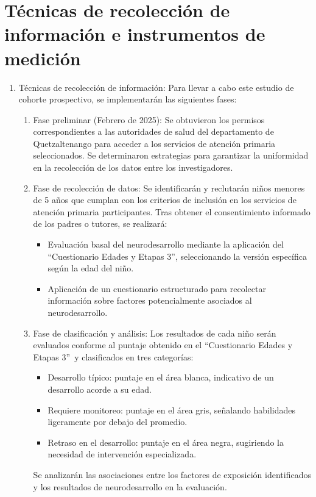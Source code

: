 \documentclass[11pt,letterpaper]{report}
\newcommand{\asq}{“Cuestionario Edades y Etapas 3”}
\begin{document}
\section{Técnicas de recolección de información e instrumentos de medición}
	\begin{enumerate}
		\item Técnicas de recolección de información: Para llevar a cabo este
		estudio de cohorte prospectivo, se implementarán las siguientes fases:
	\begin{enumerate}
		\item Fase preliminar (Febrero de 2025):
		Se obtuvieron los permisos correspondientes a las autoridades de salud
		del departamento de Quetzaltenango para acceder a los servicios de
		atención primaria seleccionados. Se determinaron estrategias para
		garantizar la uniformidad en la recolección de los datos entre los
		investigadores.
		\item Fase de recolección de datos:
		Se identificarán y reclutarán niños menores de 5 años que cumplan con
		los criterios de inclusión en los servicios de atención primaria
		participantes. Tras obtener el consentimiento informado de los padres o
		tutores, se realizará:
			\begin{itemize}
			\item Evaluación basal del neurodesarrollo mediante la aplicación
			del \asq, seleccionando la versión específica según la edad del
			niño.
			\item Aplicación de un cuestionario estructurado para recolectar
			información sobre factores potencialmente asociados al
			neurodesarrollo.
			\end{itemize}
		\item Fase de clasificación y análisis:
		Los resultados de cada niño serán evaluados conforme al
		puntaje obtenido en el \asq\
		y clasificados en tres categorías:
			\begin{itemize}
			\item Desarrollo típico: puntaje en el área blanca, indicativo de
			un desarrollo acorde a su edad.
			\item Requiere monitoreo: puntaje en el área gris, señalando
			habilidades ligeramente por debajo del promedio.
			\item Retraso en el desarrollo: puntaje en el área negra,
			sugiriendo la necesidad de intervención especializada.
			\end{itemize}
		Se analizarán las asociaciones entre los factores de exposición
		identificados y los resultados de neurodesarrollo en la evaluación.

\end{enumerate}
\end{enumerate}
\end{document}
